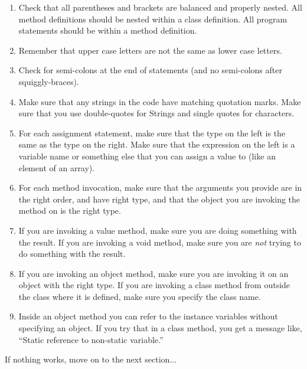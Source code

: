 \documentclass[12pt]{book}
\theoremstyle{exercise}
\begin{document}
\begin{enumerate}

\item Check that all parentheses and brackets are
balanced and properly nested.  All method definitions should be nested
within a class definition.  All program statements should be within a
method definition.

\item Remember that upper case letters are not the same as
lower case letters.

\item Check for semi-colons at the end of statements (and
no semi-colons after squiggly-braces).

\item Make sure that any strings in the code have matching
quotation marks.  Make sure that you use double-quotes for
Strings and single quotes for characters.

\item For each assignment statement, make sure that the type
on the left is the same as the type on the right.  Make sure
that the expression on the left is a variable name or something
else that you can assign a value to (like an element of an array).

\item For each method invocation, make sure that the arguments
you provide are in the right order, and have right type, and that the
object you are invoking the method on is the right type.

\item If you are invoking a value method, make sure you
are doing something with the result.  If you are invoking a
void method, make sure you are {\em not} trying to do something
with the result.

\item If you are invoking an object method, make sure you are
invoking it on an object with the right type.  If you are invoking
a class method from outside the class where it is defined, make
sure you specify the class name.

\item Inside an object method you can refer to the instance
variables without specifying an object.  If you try that in
a class method, you get a message like, ``Static
reference to non-static variable.''

\end{enumerate}

If nothing works, move on to the next section...
\end{document}
